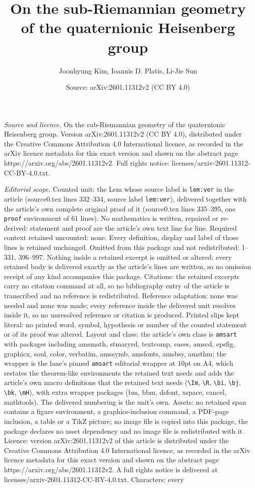 \documentclass[10pt,a4paper]{amsart}
\title[On the sub-Riemannian geometry of the quaternionic Heisenber]{On the sub-Riemannian geometry of the quaternionic Heisenberg group}
\author{Joonhyung Kim, Ioannis D. Platis, Li-Jie Sun}
\date{Source: arXiv:2601.11312v2 (CC BY 4.0)}
\begin{document}
\maketitle

\noindent\emph{Source and licence.} On the sub-Riemannian geometry of the quaternionic Heisenberg group. Version arXiv:2601.11312v2 (CC BY 4.0), distributed under the Creative Commons Attribution 4.0 International licence, as recorded in the arXiv licence metadata for this exact version and shown on the abstract page https://arxiv.org/abs/2601.11312v2. Full rights notice: licenses/arxiv-2601.11312-CC-BY-4.0.txt.\par\smallskip

\noindent\textit{Editorial scope.} Counted unit: the Lem whose source label is \texttt{lem:ver} in the article (source0.tex lines 332--334, source label \texttt{lem:ver}), delivered together with the article's own complete original proof of it (source0.tex lines 335--395, one \texttt{proof} environment of 61 lines). No mathematics is written, repaired or re-derived: statement and proof are the article's own text line for line. Required context retained uncounted: none. Every definition, display and label of those lines is retained unchanged. Omitted from this package and not redistributed: 1--331, 396--997. Nothing inside a retained excerpt is omitted or altered: every retained body is delivered exactly as the article's lines are written, so no omission receipt of any kind accompanies this package. Citations: the retained excerpts carry no citation command at all, so no bibliography entry of the article is transcribed and no reference is redistributed. Reference adaptation: none was needed and none was made; every reference inside the delivered unit resolves inside it, so no unresolved reference or citation is produced. Printed slips kept literal: no printed word, symbol, hypothesis or number of the counted statement or of its proof was altered. Layout and class: the article's own class is \texttt{amsart} with packages including amsmath, stmaryrd, textcomp, cases, amscd, epsfig, graphicx, soul, color, verbatim, amssymb, amsfonts, amsbsy, amsthm; the wrapper is the lane's pinned \texttt{amsart} editorial wrapper at 10pt on A4, which restates the theorem-like environments the retained text needs and adds the article's own macro definitions that the retained text needs (\texttt{\textbackslash Im}, \texttt{\textbackslash R}, \texttt{\textbackslash bi}, \texttt{\textbackslash bj}, \texttt{\textbackslash bk}, \texttt{\textbackslash mH}), with extra wrapper packages (bm, bbm, dsfont, xspace, cancel, mathtools). The delivered numbering is the unit's own. Assets: no retained span contains a figure environment, a graphics-inclusion command, a PDF-page inclusion, a table or a TikZ picture; no image file is copied into this package, the package declares no asset dependency and no image file is redistributed with it. Licence: version arXiv:2601.11312v2 of this article is distributed under the Creative Commons Attribution 4.0 International licence, as recorded in the arXiv licence metadata for this exact version and shown on the abstract page https://arxiv.org/abs/2601.11312v2. A full rights notice is delivered at licenses/arxiv-2601.11312-CC-BY-4.0.txt. Characters: every 
\end{document}
